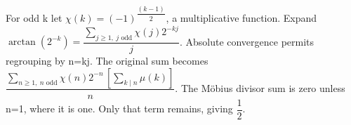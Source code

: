 For odd k let $\chi(k)=(-1)^{\dfrac{(k-1)}{2}}$, a multiplicative function. Expand $\arctan(2^{-k})=\dfrac{\sum_{j\ge1,\ j\text{ odd}}\chi(j)2^{-kj}}{j}$. Absolute convergence permits regrouping by n=kj. The original sum becomes $\dfrac{\sum_{n\ge1,\ n\text{ odd}}\chi(n)2^{-n}\,[\sum_{k\mid n}\mu(k)]}{n}$. The M\"obius divisor sum is zero unless n=1, where it is one. Only that term remains, giving $\boxed{\dfrac{1}{2}}$.
